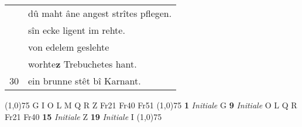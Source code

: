 \documentclass[8pt,a4paper,notitlepage]{article}
\begin{document}
\begin{table}[ht]
\begin{minipage}[t]{0.5\linewidth}
\begin{tabular}{rl}
 & dû maht âne angest strîtes pflegen.\\ 
 & sîn ecke ligent im rehte.\\ 
 & von edelem geslehte\\ 
 & worhte\textbf{z} Trebuchetes hant.\\ 
30 & ein brunne stêt bî Karnant.\\ 
\end{tabular}
\scriptsize
\line(1,0){75} \newline
G I O L M Q R Z Fr21 Fr40 Fr51 \newline
\line(1,0){75} \newline
\textbf{1} \textit{Initiale} G  \textbf{9} \textit{Initiale} O L Q R Fr21 Fr40  \textbf{15} \textit{Initiale} Z  \textbf{19} \textit{Initiale} I  \newline
\line(1,0){75} \newline

\end{minipage}
\end{table}
\end{document}
